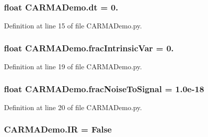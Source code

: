 \hypertarget{namespace_c_a_r_m_a_demo_a8de741bff9b4acb1631129ec80ee8306}{
\subsubsection[{dt}]{\setlength{\rightskip}{0pt plus 5cm}float C\-A\-R\-M\-A\-Demo.\-dt = 0.}}\label{namespace_c_a_r_m_a_demo_a8de741bff9b4acb1631129ec80ee8306}


Definition at line 15 of file C\-A\-R\-M\-A\-Demo.\-py.

\hypertarget{namespace_c_a_r_m_a_demo_a5054753a3c9b970a8bfd2e6cc5f7ff7d}{
\subsubsection[{frac\-Intrinsic\-Var}]{\setlength{\rightskip}{0pt plus 5cm}float C\-A\-R\-M\-A\-Demo.\-frac\-Intrinsic\-Var = 0.}}\label{namespace_c_a_r_m_a_demo_a5054753a3c9b970a8bfd2e6cc5f7ff7d}


Definition at line 19 of file C\-A\-R\-M\-A\-Demo.\-py.

\hypertarget{namespace_c_a_r_m_a_demo_a057d9699c5c2efec1048479312949b9c}{
\subsubsection[{frac\-Noise\-To\-Signal}]{\setlength{\rightskip}{0pt plus 5cm}float C\-A\-R\-M\-A\-Demo.\-frac\-Noise\-To\-Signal = 1.\-0e-\/18}}\label{namespace_c_a_r_m_a_demo_a057d9699c5c2efec1048479312949b9c}


Definition at line 20 of file C\-A\-R\-M\-A\-Demo.\-py.

\hypertarget{namespace_c_a_r_m_a_demo_a856e080e332bfee8400432bcbddadcf4}{
\subsubsection[{I\-R}]{\setlength{\rightskip}{0pt plus 5cm}C\-A\-R\-M\-A\-Demo.\-I\-R = False}}\label{namespace_c_a_r_m_a_demo_a856e080e332bfee8400432bcbddadcf4}


